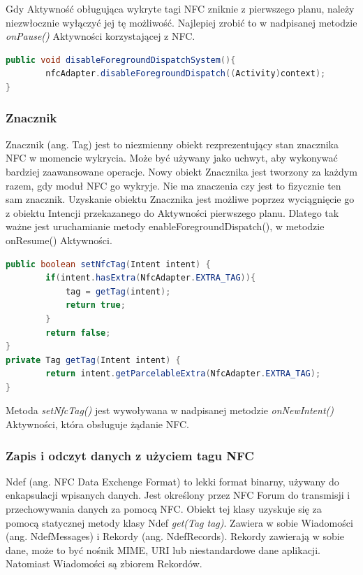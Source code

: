 \documentclass{article}
\numberwithin{equation}{section}
\begin{document}
Gdy Aktywność obługująca wykryte tagi NFC zniknie z pierwszego planu, należy niezwłocznie wyłączyć jej tę możliwość. Najlepiej zrobić to w nadpisanej metodzie \textit{onPause()} Aktywności korzystającej z NFC. 
\begin{lstlisting}[language=Java]
public void disableForegroundDispatchSystem(){
        nfcAdapter.disableForegroundDispatch((Activity)context);
}
\end{lstlisting}
\subsubsection{Znacznik}
Znacznik (ang. Tag) jest to niezmienny obiekt rezprezentujący stan znacznika NFC w momencie wykrycia. Może być używany jako uchwyt, aby wykonywać bardziej zaawansowane operacje. Nowy obiekt Znacznika jest tworzony za każdym razem, gdy moduł NFC go wykryje. Nie ma znaczenia czy jest to fizycznie ten sam znacznik. Uzyskanie obiektu Znacznika jest możliwe poprzez wyciągnięcie go z obiektu Intencji przekazanego do Aktywności pierwszego planu. Dlatego tak ważne jest uruchamianie metody enableForegroundDispatch(), w metodzie onResume() Aktywności. 
\begin{lstlisting}[language=Java]
public boolean setNfcTag(Intent intent) {
        if(intent.hasExtra(NfcAdapter.EXTRA_TAG)){
            tag = getTag(intent);
            return true;
        }
        return false;
}
private Tag getTag(Intent intent) {
        return intent.getParcelableExtra(NfcAdapter.EXTRA_TAG);
}
\end{lstlisting}
Metoda \textit{setNfcTag()} jest wywoływana w nadpisanej metodzie \textit{onNewIntent()} Aktywności, która obsługuje żądanie NFC.
\subsubsection{Zapis i odczyt danych z użyciem tagu NFC}

Ndef (ang. NFC Data Exchenge Format) to lekki format binarny, używany do enkapsulacji wpisanych danych. Jest określony przez NFC Forum do transmisji i przechowywania danych za pomocą NFC. Obiekt tej klasy uzyskuje się za pomocą statycznej metody klasy Ndef \textit{get(Tag tag)}. Zawiera w sobie Wiadomości (ang. NdefMessages) i Rekordy (ang. NdefRecords). Rekordy zawierają w sobie dane, może to być nośnik MIME, URI lub niestandardowe dane aplikacji. Natomiast Wiadomości są zbiorem Rekordów.
\end{document}
